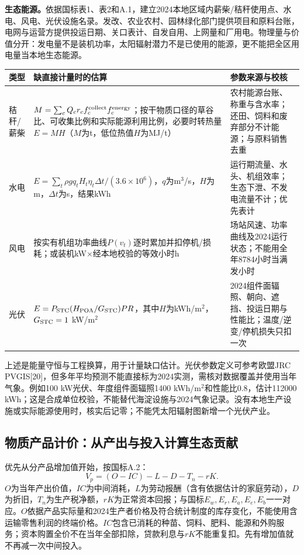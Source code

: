 \documentclass[12pt,a4paper,fontset=fandol]{ctexart}
\begin{document}
\textbf{生态能源。}依据国标表1、表2和A.1，建立2024本地区域内薪柴/秸秆使用点、水电、风电、光伏设施名录。发改、农业农村、园林绿化部门提供项目和原料台账，电网与运营方提供投运日期、关口表计、自发自用、上网量和厂用电。物理量与价值分开：发电量不是装机功率，太阳辐射潜力不是已使用的能源，更不能把全区用电量当本地生态能源。
\begin{longtable}{P{2cm}P{6.9cm}P{4.3cm}}
\toprule 类型 & 缺直接计量时的估算 & 参数来源与校核 \\\midrule\endhead
秸秆/薪柴 & $M=\sum_c Q_c r_c f_c^{\rm collect}f_c^{\rm energy}$；按干物质口径的草谷比、可收集比例和实际能源利用比例，必要时转热量$E=M H$（$M$为t，低位热值$H$为MJ/t） & 农村能源台账、称重与含水率；还田、饲料和废弃部分不计能源；与原料销售去重 \\
水电 & $E=\sum_t\rho gq_tH_t\eta_t\Delta t/(3.6\times10^6)$，$q$为m$^3$/s，$H$为m，$\Delta t$为s，结果kWh & 运行期流量、水头、机组效率；生态下泄、不发电流量不计；优先表计 \\
风电 & 按实有机组功率曲线$P(v_t)$逐时累加并扣停机/损耗；或装机kW×经本地校验的等效小时h & 场站风速、功率曲线及2024运行状态；不能用全年8784小时当满发小时 \\
光伏 & $E=P_{\rm STC}(H_{\rm POA}/G_{\rm STC})PR$，其中$H$为kWh/m$^2$，$G_{\rm STC}=1$ kW/m$^2$ & 2024组件面辐照、朝向、遮挡、投运日期与性能比；温度/逆变/停机损失只扣一次 \\
\bottomrule
\end{longtable}
上述是能量守恒与工程换算，用于计量缺口估计。光伏参数定义可参考欧盟JRC PVGIS[20]，但多年平均预测不能直接标为2024实测，需核对数据覆盖并使用当年气象。例如100 kW光伏、年度组件面辐照1400 kWh/m$^2$和性能比0.8，估计112000 kWh；这是合成单位校验，不能替代海淀设施与2024气象记录。没有本地生产设施或实际能源使用时，核实后记零；不能凭太阳辐射图新增一个光伏产业。

\subsection{物质产品计价：从产出与投入计算生态贡献}
优先从分产品增加值开始，按国标A.2：
\begin{equation}
 V_p=(O-IC)-L-D-T_n-rK.
\end{equation}
$O$为当年产出价值，$IC$为中间消耗，$L$为劳动报酬（含有依据估计的家庭劳动），$D$为折旧，$T_n$为生产税净额，$rK$为正常资本回报；与国标$E_w,E_r,E_a,E_e,E_b$一一对应。$O$依据产品实际量和2024生产者价格及符合统计制度的库存变化，不能使用含运输零售利润的终端价格。$IC$包含已消耗的种苗、饲料、肥料、能源和外购服务；资本购置全价不在当年全部扣除，贷款利息与$rK$不能重复扣。先有增加值就不再减一次中间投入。
\end{document}
